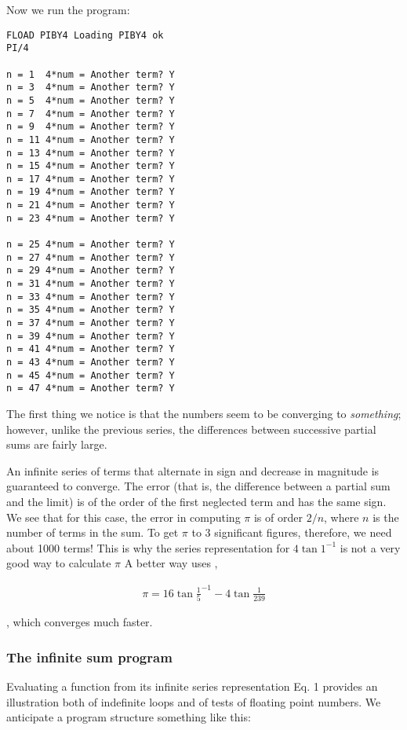 Now we run the program:

\begin{lstlisting}
FLOAD PIBY4 Loading PIBY4 ok
PI/4

n = 1  4*num = Another term? Y
n = 3  4*num = Another term? Y
n = 5  4*num = Another term? Y
n = 7  4*num = Another term? Y
n = 9  4*num = Another term? Y
n = 11 4*num = Another term? Y
n = 13 4*num = Another term? Y
n = 15 4*num = Another term? Y
n = 17 4*num = Another term? Y
n = 19 4*num = Another term? Y
n = 21 4*num = Another term? Y
n = 23 4*num = Another term? Y

n = 25 4*num = Another term? Y
n = 27 4*num = Another term? Y
n = 29 4*num = Another term? Y
n = 31 4*num = Another term? Y
n = 33 4*num = Another term? Y
n = 35 4*num = Another term? Y
n = 37 4*num = Another term? Y
n = 39 4*num = Another term? Y
n = 41 4*num = Another term? Y
n = 43 4*num = Another term? Y
n = 45 4*num = Another term? Y
n = 47 4*num = Another term? Y
\end{lstlisting}

The first thing we notice is that the numbers seem to be converging to \textit{something}; however, unlike the previous series, the differences between successive partial sums are fairly large.

An infinite series of terms that alternate in sign and decrease in magnitude is guaranteed to converge. The error (that is, the difference between a partial sum and the limit) is of the order of the first neglected term and has the same sign. We see that for this case, the error in computing $\pi$ is of order $2/n$, where $n$ is the number of terms in the sum. To get $\pi$ to 3 significant figures, therefore, we need about 1000 terms! This is why the series representation for $4\tan{1}^{-1}$ is not a very good way to calculate $\pi$ A better way uses \eg,

\begin{align}
    \pi = 16\tan{\frac{1}{5}}^{-1} - 4\tan{\frac{1}{239}}
\end{align}

, which converges much faster.

\subsubsection{The infinite sum program}
Evaluating a function from its infinite series representation Eq. 1 provides an illustration both of indefinite loops and of tests of floating point numbers. We anticipate a program structure something like this:

